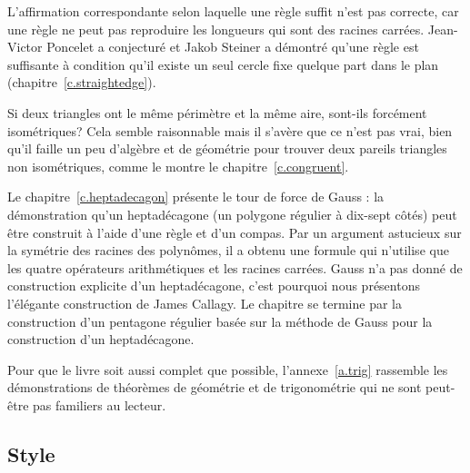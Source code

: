 L'affirmation correspondante selon laquelle une règle suffit n'est pas  correcte, car une règle ne peut pas reproduire les longueurs qui sont des racines carrées. Jean-Victor Poncelet a conjecturé et Jakob Steiner a démontré qu'une règle est suffisante à condition qu'il existe un seul cercle fixe quelque part dans le plan (chapitre~\ref{c.straightedge}).

Si deux triangles ont le même périmètre et la même aire, sont-ils forcément isométriques? Cela semble raisonnable mais il s'avère que ce n'est pas vrai, bien qu'il faille un peu d'algèbre et de géométrie pour trouver deux pareils triangles non isométriques, comme le montre le chapitre~\ref{c.congruent}.

Le chapitre~\ref{c.heptadecagon} présente le tour de force de Gauss : la démonstration qu'un heptadécagone (un polygone régulier à dix-sept côtés) peut être construit à l'aide d'une règle et d'un compas. Par un argument astucieux sur la symétrie des racines des polynômes, il a obtenu une formule qui n'utilise que les quatre opérateurs arithmétiques et les racines carrées. Gauss n'a pas donné de construction explicite d'un heptadécagone, c'est pourquoi nous présentons l'élégante construction de James Callagy. Le chapitre se termine par la construction d'un pentagone régulier basée sur la méthode de Gauss pour la construction d'un heptadécagone.

Pour que le livre soit aussi complet que possible, l'annexe~\ref{a.trig} rassemble les démonstrations de théorèmes de géométrie et de trigonométrie qui ne sont peut-être pas familiers au lecteur.

\subsection*{Style}

